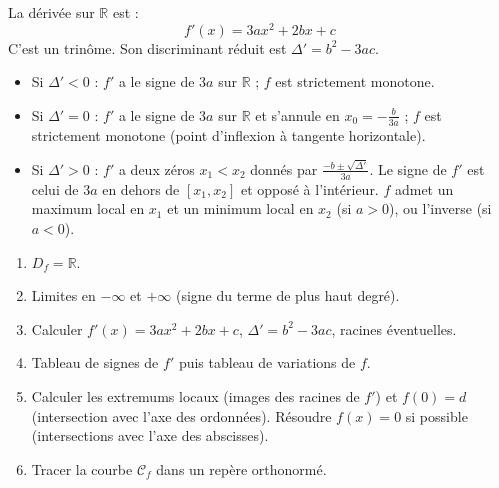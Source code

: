 \documentclass[11pt]{article}
\begin{document}
\begin{propriete}
La dérivée sur $\mathbb{R}$ est :
\[ f'(x) = 3ax^2 + 2bx + c \]
C'est un trinôme. Son discriminant réduit est $\Delta' = b^2 - 3ac$.
\begin{itemize}
  \item Si $\Delta' < 0$ : $f'$ a le signe de $3a$ sur $\mathbb{R}$ ; $f$ est strictement monotone.
  \item Si $\Delta' = 0$ : $f'$ a le signe de $3a$ sur $\mathbb{R}$ et s'annule en $x_0 = -\frac{b}{3a}$ ; $f$ est strictement monotone (point d'inflexion à tangente horizontale).
  \item Si $\Delta' > 0$ : $f'$ a deux zéros $x_1 < x_2$ donnés par $\frac{-b \pm \sqrt{\Delta'}}{3a}$. Le signe de $f'$ est celui de $3a$ en dehors de $[x_1, x_2]$ et opposé à l'intérieur. $f$ admet un maximum local en $x_1$ et un minimum local en $x_2$ (si $a>0$), ou l'inverse (si $a<0$).
\end{itemize}
\end{propriete}

\begin{methode}[Étude complète d'un polynôme degré 3 : $f(x)=ax^3+bx^2+cx+d$]
\begin{enumerate}
  \item $D_f = \mathbb{R}$.
  \item Limites en $-\infty$ et $+\infty$ (signe du terme de plus haut degré).
  \item Calculer $f'(x) = 3ax^2+2bx+c$, $\Delta' = b^2-3ac$, racines éventuelles.
  \item Tableau de signes de $f'$ puis tableau de variations de $f$.
  \item Calculer les extremums locaux (images des racines de $f'$) et $f(0)=d$ (intersection avec l'axe des ordonnées). Résoudre $f(x)=0$ si possible (intersections avec l'axe des abscisses).
  \item Tracer la courbe $\mathcal{C}_f$ dans un repère orthonormé.
\end{enumerate}
\end{methode}
\end{document}
